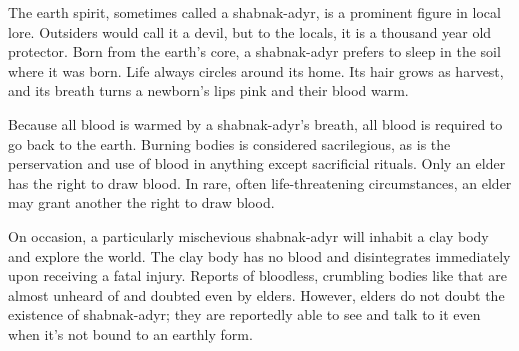 \documentclass[blue]{Pestilence}
\begin{document}
\name{\bShabnakAdyr{}}

The earth spirit, sometimes called a shabnak-adyr, is a prominent figure in local lore. Outsiders would call it a devil, but to the locals, it is a thousand year old protector. Born from the earth's core, a shabnak-adyr prefers to sleep in the soil where it was born. Life always circles around its home. Its hair grows as harvest, and its breath turns a newborn's lips pink and their blood warm. 

Because all blood is warmed by a shabnak-adyr's breath, all blood is required to go back to the earth. Burning bodies is considered sacrilegious, as is the perservation and use of blood in anything except sacrificial rituals. Only an elder has the right to draw blood. In rare, often life-threatening circumstances, an elder may grant another the right to draw blood.

On occasion, a particularly mischevious shabnak-adyr will inhabit a clay body and explore the world. The clay body has no blood and disintegrates immediately upon receiving a fatal injury. Reports of bloodless, crumbling bodies like that are almost unheard of and doubted even by elders. However, elders do not doubt the existence of shabnak-adyr; they are reportedly able to see and talk to it even when it's not bound to an earthly form.   
\end{document}
